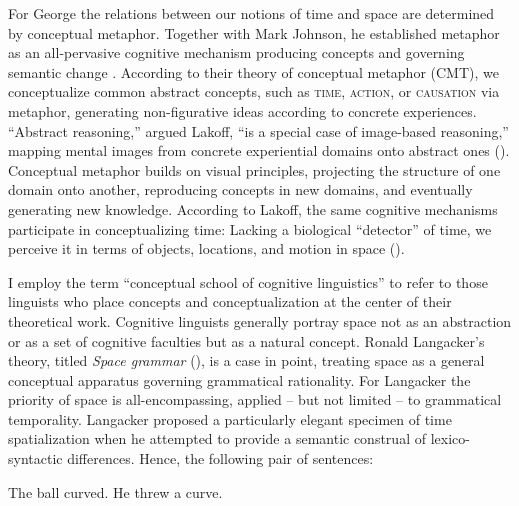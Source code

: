 \documentclass[english,output=paper,colorlinks,citecolor=brown]{../langscibook}
\begin{document}
For George \citet{Lakoff1993} the relations between our notions of time and space are determined by conceptual metaphor. Together with Mark Johnson, he established metaphor as an all-pervasive cognitive mechanism producing concepts and governing semantic change \citep{LakoffJohnson1980}. According to their theory of conceptual metaphor (CMT), we conceptualize common abstract concepts, such as \textsc{time}, \textsc{action}, or \textsc{causation} via metaphor, generating non-figurative ideas according to concrete experiences. “Abstract reasoning,” argued Lakoff, “is a special case of image-based reasoning,” mapping mental images from concrete experiential domains onto abstract ones (\citealt[229]{Lakoff1993}). Conceptual metaphor builds on visual principles, projecting the structure of one domain onto another, reproducing concepts in new domains, and eventually generating new knowledge. According to Lakoff, the same cognitive mechanisms participate in conceptualizing time: Lacking a biological “detector” of time, we perceive it in terms of objects, locations, and motion in space (\citealt[218]{Lakoff1993}).

\largerpage
I employ the term “conceptual school of cognitive linguistics” to refer to those linguists who place concepts and conceptualization at the center of their theoretical work. Cognitive linguists generally portray space not as an abstraction or as a set of cognitive faculties but as a natural concept. Ronald Langacker’s theory, titled \textit{Space grammar} (\citeyear{Langacker1982, Langacker1987}), is a case in point, treating space as a general conceptual apparatus governing grammatical rationality. For Langacker the priority of space is all-encompassing, applied -- but not limited -- to grammatical temporality. Langacker proposed a particularly elegant specimen of time spatialization when he attempted to provide a semantic construal of lexico-syntactic differences. Hence, the following pair of sentences: 

\ea \label{ex:3:1} The ball curved.
\ex \label{ex:3:2} He threw a curve.
\z
         
\end{document}
